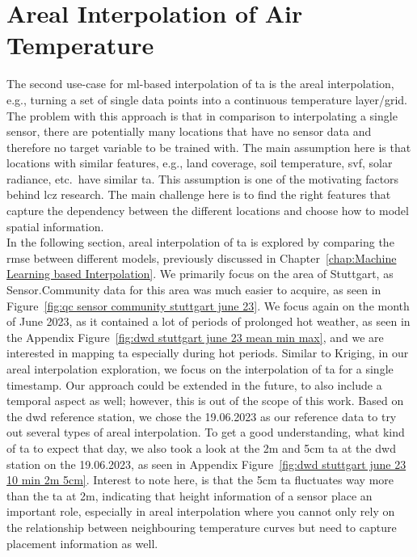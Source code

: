 \section{Areal Interpolation of Air Temperature}

The second use-case for \gls{ml}-based interpolation of \gls{ta} is the areal interpolation, e.g., turning a set of single data points into a continuous temperature layer/grid. The problem with this approach is that in comparison to interpolating a single sensor, there are potentially many locations that have no sensor data and therefore no target variable to be trained with. The main assumption here is that locations with similar features, e.g., land coverage, soil temperature, \gls{svf}, solar radiance, etc.\ have similar \gls{ta}. This assumption is one of the motivating factors behind \gls{lcz} research. The main challenge here is to find the right features that capture the dependency between the different locations and choose how to model spatial information.\\
In the following section, areal interpolation of \gls{ta} is explored by comparing the \gls{rmse} between different models, previously discussed in Chapter~\ref{chap:Machine Learning based Interpolation}. We primarily focus on the area of Stuttgart, as Sensor.Community data for this area was much easier to acquire, as seen in Figure~\ref{fig:qc sensor community stuttgart june 23}. We focus again on the month of June 2023, as it contained a lot of periods of prolonged hot weather, as seen in the Appendix Figure~\ref{fig:dwd stuttgart june 23 mean min max}, and we are interested in mapping \gls{ta} especially during hot periods. Similar to Kriging, in our areal interpolation exploration, we focus on the interpolation of \gls{ta} for a single timestamp. Our approach could be extended in the future, to also include a temporal aspect as well; however, this is out of the scope of this work. Based on the \gls{dwd} reference station, we chose the 19.06.2023 as our reference data to try out several types of areal interpolation. To get a good understanding, what kind of \gls{ta} to expect that day, we also took a look at the 2m and 5cm \gls{ta} at the \gls{dwd} station on the 19.06.2023, as seen in Appendix Figure~\ref{fig:dwd stuttgart june 23 10 min 2m 5cm}. Interest to note here, is that the 5cm \gls{ta} fluctuates way more than the \gls{ta} at 2m, indicating that height information of a sensor place an important role, especially in areal interpolation where you cannot only rely on the relationship between neighbouring temperature curves but need to capture placement information as well.\\

